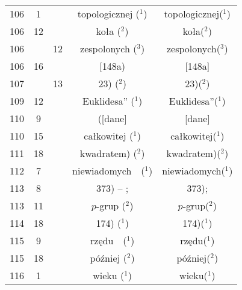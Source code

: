 \documentclass[a4paper,11pt]{article}
\begin{document}
\begin{center}
\begin{tabular}{|c|c|c|c|c|}
    106 &  1 & & topologicznej ($^{ 1 }$) & topologicznej($^{ 1 }$) \\
    106 & 12 & & koła ($^{ 2 }$) & koła($^{ 2 }$) \\
    106 & & 12 & zespolonych ($^{ 3 }$) & zespolonych($^{ 3 }$) \\
    106 & 16 & & [148a) & [148a] \\
    107 & & 13 & 23) ($^{ 2 }$) & 23)($^{ 2 }$) \\
    109 & 12 & & Euklidesa” ($^{ 1 }$) & Euklidesa”($^{ 1 }$) \\
    110 &  9 & & ([dane] & [dane] \\
    110 & 15 & & całkowitej ($^{ 1 }$) & całkowitej($^{ 1 }$) \\
    111 & 18 & & kwadratem) ($^{ 2 }$) & kwadratem)($^{ 2 }$) \\
    112 &  7 & & niewiadomych~~($^{ 1 }$) & niewiadomych($^{ 1 }$) \\
    113 &  8 & & 373) -- ; & 373); \\
    113 & 11 & & $p$-grup ($^{ 2 }$) & $p$-grup($^{ 2 }$) \\
    114 & 18 & & 174) ($^{ 1 }$) & 174)($^{ 1 }$) \\
    115 &  9 & & rzędu~~($^{ 1 }$) & rzędu($^{ 1 }$) \\
    115 & 18 & & później ($^{ 2 }$) & później($^{ 2 }$) \\
    116 &  1 & & wieku ($^{ 1 }$) & wieku($^{ 1 }$) \\
    \hline
  \end{tabular}






\end{center}
\end{document}
